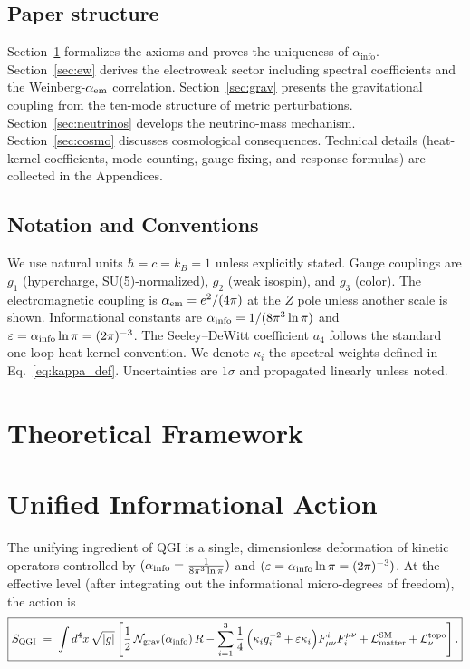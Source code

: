 \documentclass{article}
\numberwithin{equation}{section}
\theoremstyle{plain}
\theoremstyle{definition}
\theoremstyle{remark}
\newcommand{\ainfoexact}{\frac{1}{8\pi^3\ln\pi}}
\begin{document}
\subsection{Paper structure}
\label{sec:intro_structure}
Section~\ref{sec:framework} formalizes the axioms and proves the uniqueness of $\alpha_{\text{info}}$. Section~\ref{sec:ew} derives the electroweak sector including spectral coefficients and the Weinberg-$\alpha_{\rm em}$ correlation. Section~\ref{sec:grav} presents the gravitational coupling from the ten-mode structure of metric perturbations. Section~\ref{sec:neutrinos} develops the neutrino-mass mechanism. Section~\ref{sec:cosmo} discusses cosmological consequences. Technical details (heat-kernel coefficients, mode counting, gauge fixing, and response formulas) are collected in the Appendices.

\subsection{Notation and Conventions}
\label{sec:notation}
We use natural units $\hbar=c=k_B=1$ unless explicitly stated. Gauge couplings are $g_1$ (hypercharge, SU(5)-normalized), $g_2$ (weak isospin), and $g_3$ (color). The electromagnetic coupling is $\alpha_{\rm em}=e^2/(4\pi)$ at the $Z$ pole unless another scale is shown. Informational constants are
$\alpha_{\rm info}=1/(8\pi^3\ln\pi)$ and $\varepsilon=\alpha_{\rm info}\ln\pi=(2\pi)^{-3}$.
The Seeley–DeWitt coefficient $a_4$ follows the standard one-loop heat-kernel convention.
We denote $\kappa_i$ the spectral weights defined in Eq.~\eqref{eq:kappa_def}.
Uncertainties are $1\sigma$ and propagated linearly unless noted.

\section{Theoretical Framework}
\label{sec:framework}
\section{Unified Informational Action}
\label{sec:unified_action}

\noindent
The unifying ingredient of QGI is a single, dimensionless deformation of kinetic operators controlled by
$(\alpha_{\rm info}=\ainfoexact)$ and $(\varepsilon=\alpha_{\rm info}\ln\pi=(2\pi)^{-3})$.
At the effective level (after integrating out the informational micro-degrees of freedom), the action is
\begin{equation}
\boxed{
S_{\rm QGI} \;=\; \int d^4x\,\sqrt{|g|}
\left[
\frac{1}{2}\,\mathcal{N}_{\rm grav}(\alpha_{\rm info})\,R 
-\sum_{i=1}^3 \frac{1}{4}\,\Big(\kappa_i g_i^{-2}+\varepsilon\kappa_i\Big) F^{i}_{\mu\nu}F_i^{\mu\nu}
 +\mathcal{L}_{\rm matter}^{\rm SM}
 +\mathcal{L}_{\nu}^{\rm topo}
\right] .
}
\label{eq:S_QGI_master}
\end{equation}
\end{document}
